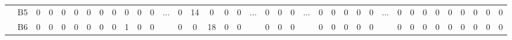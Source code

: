 \documentclass[12pt]{article}
\begin{document}
\begin{table}[!ht]
{\begin{tabular}{cccccccccccccccccccccccccccccccccccccc}
\multicolumn{1}{c|}{}                       & \multicolumn{1}{c|}{B5}  & \multicolumn{1}{c|}{0}  & \multicolumn{1}{c|}{0}  & \multicolumn{1}{c|}{0}  & \multicolumn{1}{c|}{0}  & \multicolumn{1}{c|}{0}  & \multicolumn{1}{c|}{0}  & \multicolumn{1}{c|}{0}  & \multicolumn{1}{c|}{0}  & \multicolumn{1}{c|}{0}  & \multicolumn{1}{c|}{0}  & \multicolumn{1}{c|}{\multirow{3}{*}{...}} & \multicolumn{1}{c|}{0}  & \multicolumn{1}{c|}{14} & \multicolumn{1}{c|}{0}  & \multicolumn{1}{c|}{0}  & \multicolumn{1}{c|}{0}  & \multicolumn{1}{c|}{\multirow{3}{*}{...}} & \multicolumn{1}{c|}{0}  & \multicolumn{1}{c|}{0}  & \multicolumn{1}{c|}{0}  & \multicolumn{1}{c|}{\multirow{3}{*}{...}} & \multicolumn{1}{c|}{0}  & \multicolumn{1}{c|}{0}  & \multicolumn{1}{c|}{0}  & \multicolumn{1}{c|}{0}  & \multicolumn{1}{c|}{0}  & \multicolumn{1}{c|}{\multirow{3}{*}{...}} & \multicolumn{1}{c|}{0}  & \multicolumn{1}{c|}{0}  & \multicolumn{1}{c|}{0}  & \multicolumn{1}{c|}{0}  & \multicolumn{1}{c|}{0}  & \multicolumn{1}{c|}{0}  & \multicolumn{1}{c|}{0}  & \multicolumn{1}{c|}{0}  & \multicolumn{1}{c|}{0}  \\ \cline{2-12} \cline{14-18} \cline{20-22} \cline{24-28} \cline{30-38} 
\multicolumn{1}{c|}{}                       & \multicolumn{1}{c|}{B6}  & \multicolumn{1}{c|}{0}  & \multicolumn{1}{c|}{0}  & \multicolumn{1}{c|}{0}  & \multicolumn{1}{c|}{0}  & \multicolumn{1}{c|}{0}  & \multicolumn{1}{c|}{0}  & \multicolumn{1}{c|}{0}  & \multicolumn{1}{c|}{1}  & \multicolumn{1}{c|}{0}  & \multicolumn{1}{c|}{0}  & \multicolumn{1}{c|}{}                     & \multicolumn{1}{c|}{0}  & \multicolumn{1}{c|}{0}  & \multicolumn{1}{c|}{18} & \multicolumn{1}{c|}{0}  & \multicolumn{1}{c|}{0}  & \multicolumn{1}{c|}{}                     & \multicolumn{1}{c|}{0}  & \multicolumn{1}{c|}{0}  & \multicolumn{1}{c|}{0}  & \multicolumn{1}{c|}{}                     & \multicolumn{1}{c|}{0}  & \multicolumn{1}{c|}{0}  & \multicolumn{1}{c|}{0}  & \multicolumn{1}{c|}{0}  & \multicolumn{1}{c|}{0}  & \multicolumn{1}{c|}{}                     & \multicolumn{1}{c|}{0}  & \multicolumn{1}{c|}{0}  & \multicolumn{1}{c|}{0}  & \multicolumn{1}{c|}{0}  & \multicolumn{1}{c|}{0}  & \multicolumn{1}{c|}{0}  & \multicolumn{1}{c|}{0}  & \multicolumn{1}{c|}{0}  & \multicolumn{1}{c|}{0}  \\ \cline{2-12} \cline{14-18} \cline{20-22} \cline{24-28} \cline{30-38} 

\end{tabular}}
\end{table}
\end{document}
